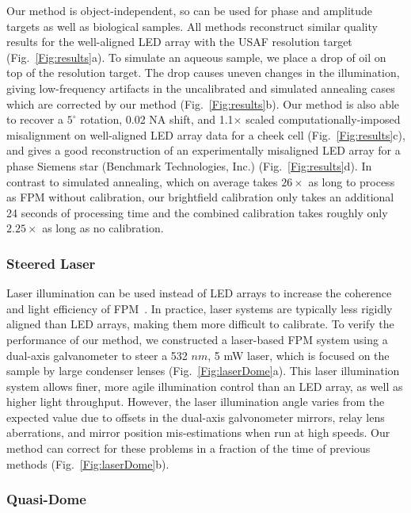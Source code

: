 Our method is object-independent, so can be used for phase and amplitude targets as well as biological samples. All methods reconstruct similar quality results for the well-aligned LED array with the USAF resolution target (Fig.~\ref{Fig:results}a). To simulate an aqueous sample, we place a drop of oil on top of the resolution target. The drop causes uneven changes in the illumination, giving low-frequency artifacts in the uncalibrated and simulated annealing cases which are corrected by our method (Fig.~\ref{Fig:results}b). Our method is also able to recover a $5^{\circ}$ rotation, 0.02 NA shift, and 1.1$\times$ scaled computationally-imposed misalignment on well-aligned LED array data for a cheek cell (Fig.~\ref{Fig:results}c), and gives a good reconstruction of an experimentally misaligned LED array for a phase Siemens star (Benchmark Technologies, Inc.) (Fig.~\ref{Fig:results}d). In contrast to simulated annealing, which on average takes $26 \times$ as long to process as FPM without calibration, our brightfield calibration only takes an additional 24 seconds of processing time and the combined calibration takes roughly only $2.25 \times$ as long as no calibration.

\subsubsection{Steered Laser}
Laser illumination can be used instead of LED arrays to increase the coherence and light efficiency of FPM~\cite{Kuang:15,Chung2016}. In practice, laser systems are typically less rigidly aligned than LED arrays, making them more difficult to calibrate. To verify the performance of our method, we constructed a laser-based FPM system using a dual-axis galvanometer to steer a 532 $nm$, 5 mW laser, which is focused on the sample by large condenser lenses (Fig.~\ref{Fig:laserDome}a). This laser illumination system allows finer, more agile illumination control than an LED array, as well as higher light throughput. However, the laser illumination angle varies from the expected value due to offsets in the dual-axis galvonometer mirrors, relay lens aberrations, and mirror position mis-estimations when run at high speeds. Our method can correct for these problems in a fraction of the time of previous methods (Fig.~\ref{Fig:laserDome}b).

\subsubsection{Quasi-Dome}

